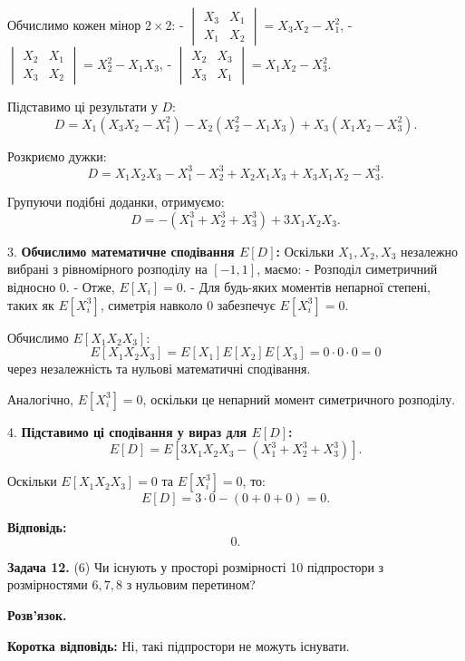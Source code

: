 \documentclass{article}
\begin{document}
   Обчислимо кожен мінор \(2 \times 2\):
   - \(\begin{vmatrix} X_3 & X_1 \\ X_1 & X_2 \end{vmatrix} = X_3X_2 - X_1^2\),
   - \(\begin{vmatrix} X_2 & X_1 \\ X_3 & X_2 \end{vmatrix} = X_2^2 - X_1X_3\),
   - \(\begin{vmatrix} X_2 & X_3 \\ X_3 & X_1 \end{vmatrix} = X_1X_2 - X_3^2\).

   Підставимо ці результати у \(D\):
   \[
   D = X_1(X_3X_2 - X_1^2) - X_2(X_2^2 - X_1X_3) + X_3(X_1X_2 - X_3^2).
   \]

   Розкриємо дужки:
   \[
   D = X_1X_2X_3 - X_1^3 - X_2^3 + X_2X_1X_3 + X_3X_1X_2 - X_3^3.
   \]

   Групуючи подібні доданки, отримуємо:
   \[
   D = - (X_1^3 + X_2^3 + X_3^3) + 3X_1X_2X_3.
   \]

3. \textbf{Обчислимо математичне сподівання \(E[D]\):}  
   Оскільки \(X_1, X_2, X_3\) незалежно вибрані з рівномірного розподілу на \([-1,1]\), маємо:
   - Розподіл симетричний відносно 0.
   - Отже, \(E[X_i] = 0\).
   - Для будь-яких моментів непарної степені, таких як \(E[X_i^3]\), симетрія навколо 0 забезпечує \(E[X_i^3] = 0\).

   Обчислимо \(E[X_1X_2X_3]\):
   \[
   E[X_1X_2X_3] = E[X_1]E[X_2]E[X_3] = 0 \cdot 0 \cdot 0 = 0
   \]
   через незалежність та нульові математичні сподівання.

   Аналогічно, \(E[X_i^3] = 0\), оскільки це непарний момент симетричного розподілу.

4. \textbf{Підставимо ці сподівання у вираз для \(E[D]\):}  
   \[
   E[D] = E[3X_1X_2X_3 - (X_1^3 + X_2^3 + X_3^3)].
   \]

   Оскільки \(E[X_1X_2X_3]=0\) та \(E[X_i^3]=0\), то:
   \[
   E[D] = 3 \cdot 0 - (0 + 0 + 0) = 0.
   \]

\textbf{Відповідь:}
\[
\boxed{0}.
\]

\bigskip

\noindent\textbf{Задача 12.} (6) Чи існують у просторі розмірності 10 підпростори з розмірностями \(6, 7, 8\) з нульовим перетином?

\textbf{Розв’язок.} 

\textbf{Коротка відповідь:} Ні, такі підпростори не можуть існувати.
\end{document}
